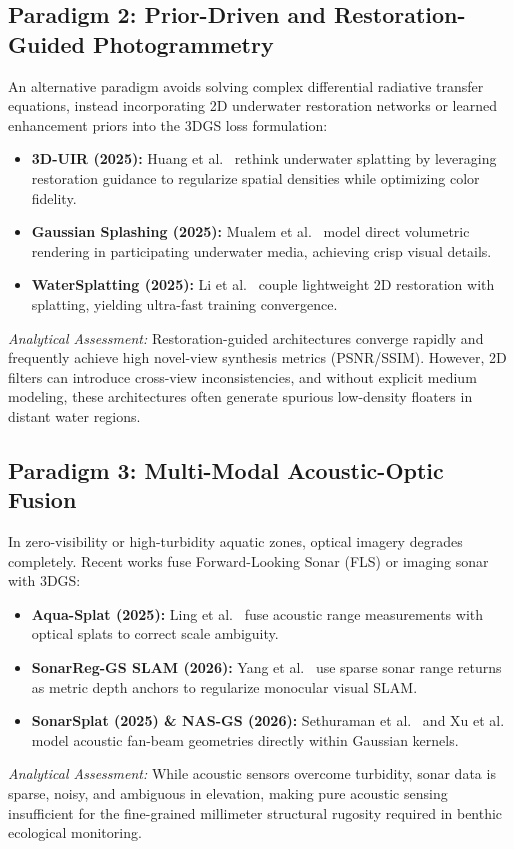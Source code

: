 \subsection{Paradigm 2: Prior-Driven and Restoration-Guided Photogrammetry}
An alternative paradigm avoids solving complex differential radiative transfer equations, instead incorporating 2D underwater restoration networks or learned enhancement priors into the 3DGS loss formulation:
\begin{itemize}
    \item \textbf{3D-UIR (2025):} Huang et al.~\cite{huang2025restorationreconstructionrethinking3d} rethink underwater splatting by leveraging restoration guidance to regularize spatial densities while optimizing color fidelity.
    \item \textbf{Gaussian Splashing (2025):} Mualem et al.~\cite{mualem2025gaussiansplashingdirectvolumetric} model direct volumetric rendering in participating underwater media, achieving crisp visual details.
    \item \textbf{WaterSplatting (2025):} Li et al.~\cite{li2025watersplattingfastunderwater3d} couple lightweight 2D restoration with splatting, yielding ultra-fast training convergence.
\end{itemize}
\textit{Analytical Assessment:} Restoration-guided architectures converge rapidly and frequently achieve high novel-view synthesis metrics (PSNR/SSIM). However, 2D filters can introduce cross-view inconsistencies, and without explicit medium modeling, these architectures often generate spurious low-density floaters in distant water regions.

\subsection{Paradigm 3: Multi-Modal Acoustic-Optic Fusion}
In zero-visibility or high-turbidity aquatic zones, optical imagery degrades completely. Recent works fuse Forward-Looking Sonar (FLS) or imaging sonar with 3DGS:
\begin{itemize}
    \item \textbf{Aqua-Splat (2025):} Ling et al.~\cite{11184160} fuse acoustic range measurements with optical splats to correct scale ambiguity.
    \item \textbf{SonarReg-GS SLAM (2026):} Yang et al.~\cite{s26154713} use sparse sonar range returns as metric depth anchors to regularize monocular visual SLAM.
    \item \textbf{SonarSplat (2025) \& NAS-GS (2026):} Sethuraman et al.~\cite{11223217} and Xu et al.~\cite{xu2026nasgsnoiseawaresonargaussian} model acoustic fan-beam geometries directly within Gaussian kernels.
\end{itemize}
\textit{Analytical Assessment:} While acoustic sensors overcome turbidity, sonar data is sparse, noisy, and ambiguous in elevation, making pure acoustic sensing insufficient for the fine-grained millimeter structural rugosity required in benthic ecological monitoring.

